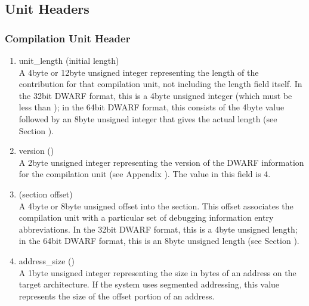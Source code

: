 \subsection{Unit Headers}
\label{datarep:unitheaders}

\subsubsection{Compilation Unit Header}
\label{datarep:compilationunitheader}
\begin{enumerate}[1. ]

\item unit\_length (initial length) \\
A 4\dash byte or 12\dash byte 
unsigned integer representing the length
of the 
contribution for that compilation unit,
not including the length field itself. In the 32\dash bit DWARF
format, this is a 4\dash byte unsigned integer (which must be less
than \xfffffffzero); in the 64\dash bit DWARF format, this consists
of the 4\dash byte value \wffffffff followed by an 8\dash byte unsigned
integer that gives the actual length 
(see Section ).

\item  version () \\
A 2\dash byte unsigned integer representing the version of the
DWARF information for the compilation unit  
(see Appendix ). 
The value in this field is 4.

\item {} (section offset) \\
A 
4\dash byte or 8\dash byte unsigned offset into the 
section. This offset associates the compilation unit with a
particular set of debugging information entry abbreviations. In
the 32\dash bit DWARF format, this is a 4\dash byte unsigned length;
in the 64\dash bit DWARF format, this is an 8\dash byte unsigned length
(see Section ).

\item address\_size () \\
A 1\dash byte unsigned integer representing the size in bytes of
an address on the target architecture. If the system uses
segmented addressing, this value represents the size of the
offset portion of an address.


\end{enumerate}

